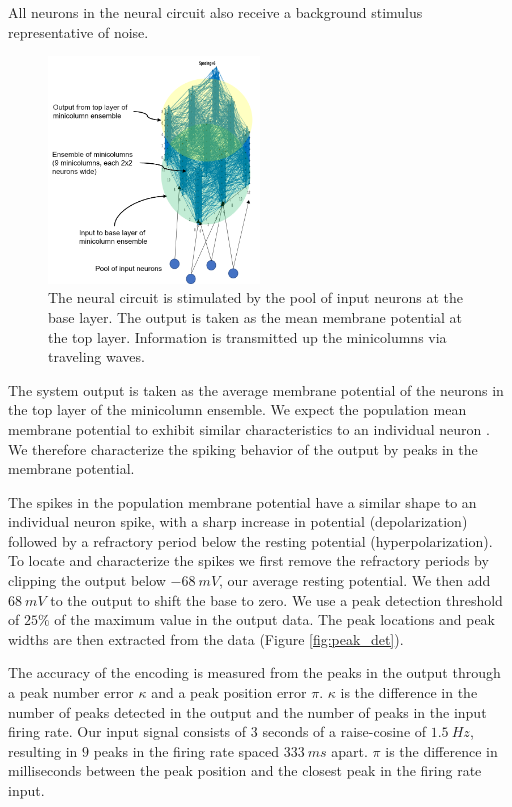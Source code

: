 \documentclass[a4paper,11pt]{article}
\begin{document}
All neurons in the neural circuit also receive a background stimulus representative of noise.

\begin{figure}[!ht]
 \caption{The neural circuit is stimulated by the pool of input neurons at the base layer. The output is taken as the mean membrane potential at the top layer. Information is transmitted up the minicolumns via traveling waves. }
 \label{fig:system_diagram}
 \centering
   \includegraphics[width=0.5\textwidth]{fig/SystemDiagram}
\end{figure}

The system output is taken as the average membrane potential of the neurons in the top layer of the minicolumn ensemble.
We expect the population mean membrane potential to exhibit similar characteristics to an individual neuron \cite{trappenberg}.
We therefore characterize the spiking behavior of the output by peaks in the membrane potential.

The spikes in the population membrane potential have a similar shape to an individual neuron spike, with a sharp increase in potential (depolarization) followed by a refractory period below the resting potential (hyperpolarization).
To locate and characterize the spikes we first remove the refractory periods by clipping the output below $-68\ mV$, our average resting potential.
We then add $68\ mV$ to the output to shift the base to zero.
We use a peak detection threshold of $25\%$ of the maximum value in the output data.
The peak locations and peak widths are then extracted from the data (Figure \ref{fig:peak_det}).

The accuracy of the encoding is measured from the peaks in the output through a peak number error $\kappa$ and a peak position error $\pi$.
$\kappa$ is the difference in the number of peaks detected in the output and the number of peaks in the input firing rate.
Our input signal consists of $3$ seconds of a raise-cosine of $1.5\ Hz$, resulting in $9$ peaks in the firing rate spaced $333\ ms$ apart.
$\pi$ is the difference in milliseconds between the peak position and the closest peak in the firing rate input.
\end{document}
